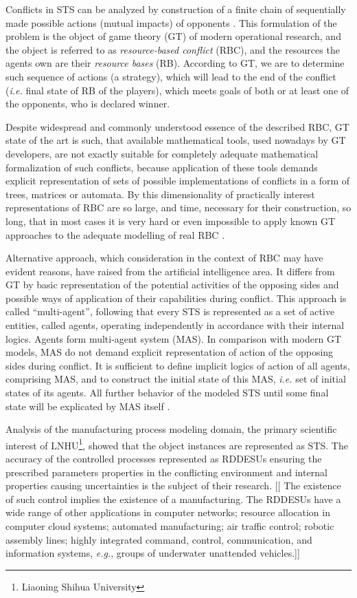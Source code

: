 \documentclass[runningheads]{llncs}
\begin{document}
Conflicts in STS can be analyzed by construction of a finite chain of sequentially made possible actions (mutual impacts) of opponents \cite{rbg}. This formulation of the problem is the object of game theory (GT) of modern operational research, and the object is referred to as \emph{resource-based conflict} (RBC), and the resources the agents own are their \emph{resource bases} (RB). According to GT, we are to determine such sequence of actions (a strategy), which will lead to the end of the conflict (\emph{i.e.} final state of RB of the players), which meets goals of both or at least one of the opponents, who is declared winner.

Despite widespread and commonly understood essence of the described RBC, GT state of the art is such, that available mathematical tools, used nowadays by GT developers, are not exactly suitable for completely adequate mathematical formalization of such conflicts, because application of these tools demands explicit representation of sets of possible implementations of conflicts in a form of trees, matrices or automata. By this dimensionality of practically interest representations of RBC are so large, and time, necessary for their construction, so long, that in most cases it is very hard or even impossible to apply known GT approaches to the adequate modelling of real RBC \cite{rbg}.

Alternative approach, which consideration in the context of RBC may have evident reasons, have raised from the artificial intelligence area. It differs from GT by basic representation of the potential activities of the opposing sides and possible ways of application of their capabilities during conflict. This approach is called “multi-agent”, following that every STS is represented as a set of active entities, called agents, operating independently in accordance with their internal logics. Agents form multi-agent system (MAS). In comparison with modern GT models, MAS do not demand explicit representation of action of the opposing sides during conflict. It is sufficient to define implicit logics of action of all agents, comprising MAS, and to construct the initial state of this MAS, \emph{i.e.} set of initial states of its agents. All further behavior of the modeled STS until some final state will be explicated by MAS itself \cite{rbg}.

Analysis of the manufacturing process modeling domain, the primary scientific interest of LNHU\footnote{Liaoning Shihua University}, showed that the object instances are represented as STS. The accuracy of the controlled processes represented as RDDESUs ensuring the prescribed parameters properties in the conflicting environment and internal properties causing uncertainties is the subject of their research. [[ The existence of such control implies the existence of a manufacturing. The RDDESUs have a wide range of other applications in computer networks; resource allocation in computer cloud systems; automated manufacturing; air traffic control; robotic assembly lines; highly integrated command, control, communication, and information systems, \emph{e.g.}, groups of underwater unattended vehicles.]]
\end{document}
